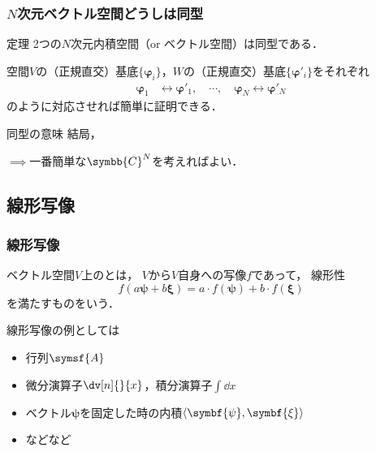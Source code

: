 \documentclass[
    10pt,
    ]{sotsu-beamer}
\begin{document}
\begin{frame}
    [label={frame:finite-dimensional-vector-space-isomorphic}]
    \frametitle{$N$次元ベクトル空間どうしは同型}

    \begin{block}{定理}
        2つの$N$次元内積空間（or ベクトル空間）は同型である．
    \end{block}

    空間$V$の（正規直交）基底$\{\symbf{\varphi}_i\}$，$W$の（正規直交）基底$\{\symbf{\varphi}'_i\}$をそれぞれ
    \begin{align*}
        \symbf{\varphi}_1 &\leftrightarrow \symbf{\varphi}'_1, 
        \quad
        \cdots, 
        \quad
        \symbf{\varphi}_N \leftrightarrow \symbf{\varphi}'_N
    \end{align*}
    のように対応させれば簡単に証明できる．

    \pause

    \begin{alertblock}{同型の意味}
        結局，
    \end{alertblock}

    $\implies$一番簡単な$\symbb{C}^N$を考えればよい．

\end{frame}



\subsection{線形写像}

\begin{frame}
    \frametitle{線形写像}

    ベクトル空間$V$上のとは，
    $V$から$V$自身への写像$f$であって，
    線形性
    \begin{equation*}
        f(a \symbf{\psi} + b \symbf{\xi}) = a \cdotp f(\symbf{\psi}) + b \cdotp f(\symbf{\xi})
    \end{equation*}
    を満たすものをいう．

    \pause

    線形写像の例としては
    \begin{itemize}
        \item 行列$\symsf{A}$
        \item 微分演算子$\dv[n]{}{x}$，積分演算子$\int \dd{x}$
        \item ベクトル$\symbf{\psi}$を固定した時の内積$\iparen{\symbf{\psi}, \symbf{\xi}}$
        \item などなど
    \end{itemize}

\end{frame}
\end{document}
